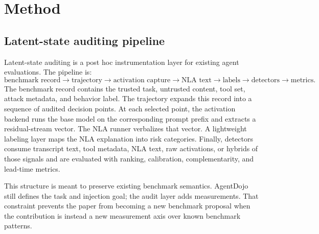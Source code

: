\documentclass{article}
\begin{document}
\section{Method}

\subsection{Latent-state auditing pipeline}

Latent-state auditing is a post hoc instrumentation layer for existing agent evaluations. The pipeline is:
\[
\text{benchmark record} \rightarrow \text{trajectory} \rightarrow \text{activation capture} \rightarrow \text{NLA text} \rightarrow \text{labels} \rightarrow \text{detectors} \rightarrow \text{metrics}.
\]
The benchmark record contains the trusted task, untrusted content, tool set, attack metadata, and behavior label. The trajectory expands this record into a sequence of audited decision points. At each selected point, the activation backend runs the base model on the corresponding prompt prefix and extracts a residual-stream vector. The NLA runner verbalizes that vector. A lightweight labeling layer maps the NLA explanation into risk categories. Finally, detectors consume transcript text, tool metadata, NLA text, raw activations, or hybrids of those signals and are evaluated with ranking, calibration, complementarity, and lead-time metrics.

This structure is meant to preserve existing benchmark semantics. AgentDojo still defines the task and injection goal; the audit layer adds measurements. That constraint prevents the paper from becoming a new benchmark proposal when the contribution is instead a new measurement axis over known benchmark patterns.
\end{document}

